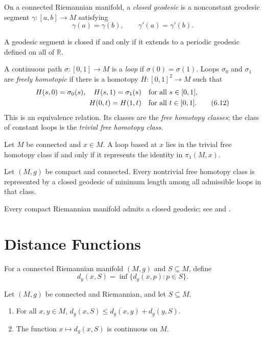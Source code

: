 On a connected Riemannian manifold, a \emph{closed geodesic} is a nonconstant
geodesic segment $\gamma\colon[a,b]\to M$ satisfying
\[
\gamma(a)=\gamma(b),
\qquad
\gamma'(a)=\gamma'(b).
\]

\begin{exercise}
\label{exer:closed-geodesic-periodic-extension}
A geodesic segment is closed if and only if it extends to a periodic geodesic
defined on all of $\mathbb R$.
\end{exercise}

A continuous path $\sigma\colon[0,1]\to M$ is a \emph{loop} if
$\sigma(0)=\sigma(1)$. Loops $\sigma_0$ and $\sigma_1$ are \emph{freely
homotopic} if there is a homotopy $H\colon[0,1]^2\to M$ such that
\begin{align}
H(s,0)=\sigma_0(s),\quad H(s,1)=\sigma_1(s)
&\quad\text{for all }s\in[0,1], \notag\\
H(0,t)=H(1,t)&\quad\text{for all }t\in[0,1]. \tag{6.12}
\end{align}
This is an equivalence relation. Its classes are the \emph{free homotopy
classes}; the class of constant loops is the \emph{trivial free homotopy
class}.

\begin{exercise}
\label{exer:trivial-free-homotopy-identity}
Let $M$ be connected and $x\in M$. A loop based at $x$ lies in the trivial
free homotopy class if and only if it represents the identity in
$\pi_1(M,x)$.
\end{exercise}

\begin{proposition}
\label{prop:existence-closed-geodesics}
Let $(M,g)$ be compact and connected. Every nontrivial free homotopy class is
represented by a closed geodesic of minimum length among all admissible loops
in that class.
\end{proposition}

Every compact Riemannian manifold admits a closed geodesic; see
\cite{Jos17} and \cite{Kli95}.
\section{Distance Functions}

For a connected Riemannian manifold $(M,g)$ and $S\subseteq M$, define
\[
d_g(x,S)=\inf\{d_g(x,p):p\in S\}.
\]

\begin{lemma}
\label{lem:distance-triangle-inequality-and-continuity}

Let $(M,g)$ be connected and Riemannian, and let $S\subseteq M$.
\begin{enumerate}[label=(\alph*)]
\item For all $x,y\in M$,
$d_g(x,S)\leq d_g(x,y)+d_g(y,S)$.
\item The function $x\mapsto d_g(x,S)$ is continuous on $M$.
\end{enumerate}
\end{lemma}

